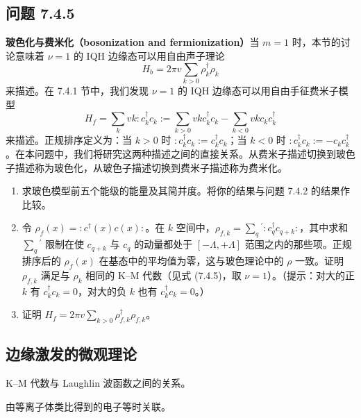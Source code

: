 \subsection*{问题 7.4.5}

\textbf{玻色化与费米化（bosonization and fermionization）}当 $m=1$ 时，本节的讨论意味着 $\nu=1$ 的 IQH 边缘态可以用自由声子理论
\begin{equation*}
H_b=2\pi v\sum_{k>0}\rho_k^\dagger\rho_k
\end{equation*}
来描述。在 7.4.1 节中，我们发现 $\nu=1$ 的 IQH 边缘态可以用自由手征费米子模型
\begin{equation*}
H_f=\sum_k vk:c_k^\dagger c_k:=\sum_{k>0}vkc_k^\dagger c_k-\sum_{k<0}vkc_kc_k^\dagger
\end{equation*}
来描述。正规排序定义为：当 $k>0$ 时 $:c_k^\dagger c_k:=c_k^\dagger c_k$；当 $k<0$ 时 $:c_k^\dagger c_k:=-c_kc_k^\dagger$。在本问题中，我们将研究这两种描述之间的直接关系。从费米子描述切换到玻色子描述称为玻色化，从玻色子描述切换到费米子描述称为费米化。
\begin{enumerate}
\item 求玻色模型前五个能级的能量及其简并度。将你的结果与问题 7.4.2 的结果作比较。
\item 令 $\rho_f(x)=:c^\dagger(x)c(x):$。在 $k$ 空间中，$\rho_{f,k}=\sum_q{}^{\prime}:c_q^\dagger c_{q+k}:$，其中求和 $\sum_q{}^{\prime}$ 限制在使 $c_{q+k}$ 与 $c_q$ 的动量都处于 $[-\Lambda,+\Lambda]$ 范围之内的那些项。正规排序后的 $\rho_f(x)$ 在基态中的平均值为零，这与玻色理论中的 $\rho$ 一致。证明 $\rho_{f,k}$ 满足与 $\rho_k$ 相同的 K--M 代数（见式 (7.4.5)，取 $\nu=1$）。（提示：对大的正 $k$ 有 $c_k^\dagger c_k=0$，对大的负 $k$ 也有 $c_k^\dagger c_k=0$。）
\item 证明 $H_f=2\pi v\sum_{k>0}\rho_{f,k}^\dagger\rho_{f,k}$。
\end{enumerate}

\subsection{边缘激发的微观理论}

\begin{keypoints}
\item K--M 代数与 Laughlin 波函数之间的关系。
\item 由等离子体类比得到的电子等时关联。
\end{keypoints}

